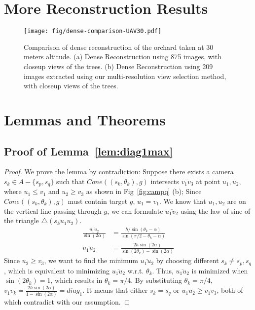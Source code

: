 \appendix
\label{sec:appendix}

\section{More Reconstruction Results}
\begin{figure*}
\centering
	\texttt{[image: fig/dense-comparison-UAV30.pdf]}
	\caption{Comparison of dense reconstruction of the orchard taken at 30 meters altitude. (a) Dense Reconstruction using 875 images, with closeup views of the trees. (b) Dense Reconstruction using 209 images extracted using our multi-resolution view selection method, with closeup views of the trees. }
\label{fig:denseComp30}
\end{figure*} 



\section{Lemmas and Theorems}
\subsection{Proof of Lemma~\ref{lem:diag1max}}
\begin{proof}
We prove the lemma by contradiction:
Suppose there exists a camera $s_k \in A-\{s_p,s_q\}$ such that
$Cone((s_k,\theta_k),g)$ intersects $\overline{v_1v_3}$ at point $u_1,u_2$, where $u_1 \leq v_1$ and $u_2 \geq v_3$ as shown in Fig~\ref{fig:campq} (b); 
Since $Cone((s_k,\theta_k),g)$ must contain target $g$, $u_1 = v_1$. 
We know that $u_1,u_2$ are on the vertical line passing through $g$, we can formulate $\overline{u_1v_2}$ using the law of sine of the triangle $\triangle(s_ku_1u_2)$.
\begin{align*}
\frac{\overline{u_1u_2}}{\sin(2\alpha)} &= \frac{h/\sin(\theta_k-\alpha)}{\sin(\pi/2-\theta_k-\alpha)} \\
\overline{u_1u_2} &= \frac{2h\sin(2\alpha)}{\sin(2\theta_k)-\sin(2\alpha)}
\end{align*}
Since $u_2 \geq v_3$, we want to find the minimum $\overline{u_1u_2}$ by choosing different $s_k \neq s_p,s_q$, which is equivalent to minimizing $\overline{u_1u_2}$ w.r.t. $\theta_k$. 
Thus, $\overline{u_1u_2}$ is minimized when $\sin(2\theta_k) = 1$, which results in $\theta_k = \pi/4$.
By substituting $\theta_k=\pi/4$, $\overline{v_1v_k} = \frac{2h\sin(2\alpha)}{1-\sin(2\alpha)} = diag_1$. It means that either $s_k = s_q$ or $\overline{u_1u_2} \geq \overline{v_1v_3}$, both of  which contradict with our assumption. 
\end{proof}

